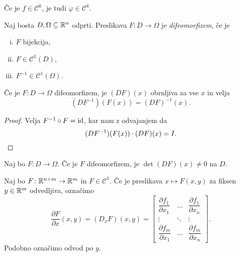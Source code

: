 
\begin{opomba}
Če je $f \in \mathcal{C}^k$, je tudi $\varphi \in \mathcal{C}^k$.
\end{opomba}

\begin{definicija}
Naj bosta $D, \Omega \subseteq \mathbb{R}^n$ odprti. Preslikava
$F \colon D \to \Omega$ je \emph{difeomorfizem}, če je

\begin{enumerate}[i)]
\item $F$ bijekcija,
\item $F \in \mathcal{C}^1(D)$,
\item $F^{-1} \in \mathcal{C}^1(\Omega)$.
\end{enumerate}
\end{definicija}

\begin{trditev}
Če je $F \colon D \to \Omega$ difeomorfizem, je $(DF)(x)$ obrnljiva
za vse $x$ in velja
\[
(DF^{-1})(F(x)) = (DF)^{-1}(x).
\]
\end{trditev}

\begin{proof}
Velja $F^{-1} \circ F = \operatorname{id}$, kar nam z odvajanjem da
\[
(DF^{-1})(F(x)) \cdot (DF)(x) = I. \qedhere
\]
\end{proof}

\begin{posledica}
Naj bo $F \colon D \to \Omega$. Če je $F$ difeomorfizem, je
$\det(DF)(x) \ne 0$ na $D$.
\end{posledica}

\begin{definicija}
Naj bo $F \colon \mathbb{R}^{n+m} \to \mathbb{R}^m$ in $F \in \mathcal{C}^1$.
Če je preslikava $x \mapsto F(x,y)$ za fiksen $y \in \mathbb{R}^m$
odvedljiva, označimo
\[
\frac{\partial F}{\partial x}(x,y) = (D_x F)(x,y) =
\begin{bmatrix}
\dfrac{\partial f_1}{\partial x_1} &
\dots                             &
\dfrac{\partial f_1}{\partial x_n} \\ 
\vdots                            &
\ddots                            &
\vdots                            \\ 
\dfrac{\partial f_m}{\partial x_1} &
\dots                             &
\dfrac{\partial f_m}{\partial x_n}
\end{bmatrix}.
\]
Podobno označimo odvod po $y$.
\end{definicija}

